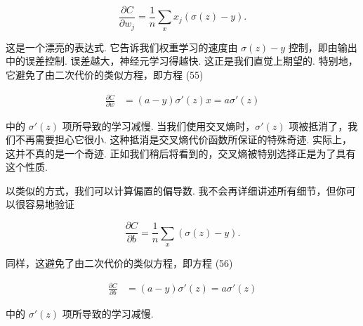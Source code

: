 \begin{equation}
\frac{\partial C}{\partial w_j} = \frac{1}{n} \sum_x x_j(\sigma(z)-y).
\tag{61}
\end{equation}

\noindent 这是一个漂亮的表达式. 它告诉我们权重学习的速度由 $\sigma(z)-y$ 控制，即由输出中的误差控制. 误差越大，神经元学习得越快. 这正是我们直觉上期望的. 特别地，它避免了由二次代价的类似方程，即方程 (55)

\begin{align*}
\frac{\partial C}{\partial w} &= (a-y)\sigma'(z) x = a \sigma'(z) \nonumber
\end{align*}

\noindent 中的 $\sigma'(z)$ 项所导致的学习减慢. 当我们使用交叉熵时，$\sigma'(z)$ 项被抵消了，我们不再需要担心它很小. 这种抵消是交叉熵代价函数所保证的特殊奇迹. 实际上，这并不真的是一个奇迹. 正如我们稍后将看到的，交叉熵被特别选择正是为了具有这个性质.

以类似的方式，我们可以计算偏置的偏导数. 我不会再详细讲述所有细节，但你可以很容易地验证

\begin{equation}
\frac{\partial C}{\partial b} = \frac{1}{n} \sum_x (\sigma(z)-y).
\tag{62}
\end{equation}

\noindent 同样，这避免了由二次代价的类似方程，即方程 (56)

\begin{align*}
\frac{\partial C}{\partial b} &= (a-y)\sigma'(z) = a \sigma'(z) \nonumber
\end{align*}

\noindent 中的 $\sigma'(z)$ 项所导致的学习减慢.


